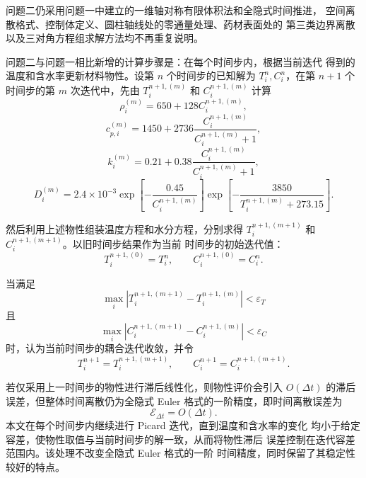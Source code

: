\documentclass[12pt,a4paper]{article}
\begin{document}
问题二仍采用问题一中建立的一维轴对称有限体积法和全隐式时间推进，
空间离散格式、控制体定义、圆柱轴线处的零通量处理、药材表面处的
第三类边界离散以及三对角方程组求解方法均不再重复说明。

问题二与问题一相比新增的计算步骤是：在每个时间步内，根据当前迭代
得到的温度和含水率更新材料物性。设第 $n$ 个时间步的已知解为
$T_i^n,C_i^n$，在第 $n+1$ 个时间步的第 $m$ 次迭代中，先由
$T_i^{n+1,(m)}$ 和 $C_i^{n+1,(m)}$ 计算
\begin{equation}
\rho_i^{(m)}
=
650+128C_i^{n+1,(m)},
\end{equation}
\begin{equation}
c_{p,i}^{(m)}
=
1450+2736
\frac{C_i^{n+1,(m)}}{C_i^{n+1,(m)}+1},
\end{equation}
\begin{equation}
k_i^{(m)}
=
0.21+0.38
\frac{C_i^{n+1,(m)}}{C_i^{n+1,(m)}+1},
\end{equation}
\begin{equation}
D_i^{(m)}
=
2.4\times10^{-3}
\exp\left[
-\frac{0.45}{C_i^{n+1,(m)}}
\right]
\exp\left[
-\frac{3850}{T_i^{n+1,(m)}+273.15}
\right].
\end{equation}

然后利用上述物性组装温度方程和水分方程，分别求得
$T_i^{n+1,(m+1)}$ 和 $C_i^{n+1,(m+1)}$。以旧时间步结果作为当前
时间步的初始迭代值：
\begin{equation}
T_i^{n+1,(0)}=T_i^n,\qquad
C_i^{n+1,(0)}=C_i^n.
\end{equation}

当满足
\begin{equation}
\max_i
\left|T_i^{n+1,(m+1)}-T_i^{n+1,(m)}\right|
<\varepsilon_T
\end{equation}
且
\begin{equation}
\max_i
\left|C_i^{n+1,(m+1)}-C_i^{n+1,(m)}\right|
<\varepsilon_C
\end{equation}
时，认为当前时间步的耦合迭代收敛，并令
\begin{equation}
T_i^{n+1}=T_i^{n+1,(m+1)},\qquad
C_i^{n+1}=C_i^{n+1,(m+1)}.
\end{equation}

若仅采用上一时间步的物性进行滞后线性化，则物性评价会引入
\(O(\Delta t)\) 的滞后误差，但整体时间离散仍为全隐式 Euler
格式的一阶精度，即时间离散误差为
\begin{equation}
\mathcal{E}_{\Delta t}=O(\Delta t).
\end{equation}
本文在每个时间步内继续进行 Picard 迭代，直到温度和含水率的变化
均小于给定容差，使物性取值与当前时间步的解一致，从而将物性滞后
误差控制在迭代容差范围内。该处理不改变全隐式 Euler 格式的一阶
时间精度，同时保留了其稳定性较好的特点。
\end{document}
